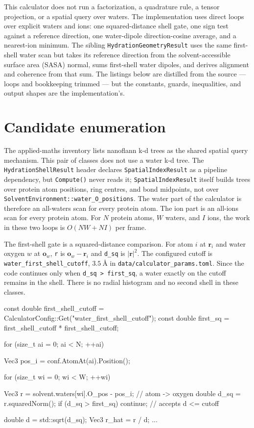 \documentclass[11pt]{article}
\newcommand{\code}[1]{\texttt{#1}}
\begin{document}

This calculator does not run a factorization, a quadrature rule, a tensor
projection, or a spatial query over waters. The implementation uses direct
loops over explicit waters and ions: one squared-distance shell gate, one sign
test against a reference direction, one water-dipole direction-cosine average,
and a nearest-ion minimum. The sibling \code{HydrationGeometryResult} uses the
same first-shell water scan but takes its reference direction from the
solvent-accessible surface area (SASA) normal, sums first-shell water dipoles,
and derives alignment and coherence from that sum. The listings below are
distilled from the source --- loops and bookkeeping trimmed --- but the
constants, guards, inequalities, and output shapes are the implementation's.

\section{Candidate enumeration}

The applied-maths inventory lists nanoflann k-d trees as the shared spatial
query mechanism. This pair of classes does not use a water k-d tree. The
\code{HydrationShellResult} header declares \code{SpatialIndexResult} as a
pipeline dependency, but \code{Compute()} never reads it; \code{SpatialIndexResult}
itself builds trees over protein atom positions, ring centres, and bond
midpoints, not over \code{SolventEnvironment::water\_O\_positions}. The water
part of the calculator is therefore an all-waters scan for every protein atom.
The ion part is an all-ions scan for every protein atom. For \(N\) protein atoms,
\(W\) waters, and \(I\) ions, the work in these two loops is \(O(NW+NI)\) per
frame.

The first-shell gate is a squared-distance comparison. For atom \(i\) at
\(\bm r_i\) and water oxygen \(w\) at \(\bm o_w\), \code{r} is
\(\bm o_w-\bm r_i\) and \code{d\_sq} is \(|\bm r|^2\). The configured cutoff is
\code{water\_first\_shell\_cutoff}, \(\SI{3.5}{\angstrom}\) in
\code{data/calculator\_params.toml}. Since the code continues only when
\code{d\_sq > first\_sq}, a water exactly on the cutoff remains in the shell.
There is no radial histogram and no second shell in these classes.

\begin{codebox}
const double first_shell_cutoff =
    CalculatorConfig::Get("water_first_shell_cutoff");
const double first_sq = first_shell_cutoff * first_shell_cutoff;

for (size_t ai = 0; ai < N; ++ai) {
    Vec3 pos_i = conf.AtomAt(ai).Position();

    for (size_t wi = 0; wi < W; ++wi) {
        Vec3 r = solvent.waters[wi].O_pos - pos_i;  // atom -> oxygen
        double d_sq = r.squaredNorm();
        if (d_sq > first_sq) continue;              // accepts d <= cutoff

        double d = std::sqrt(d_sq);
        Vec3 r_hat = r / d;
        ...
    }
}
\end{codebox}
\end{document}
